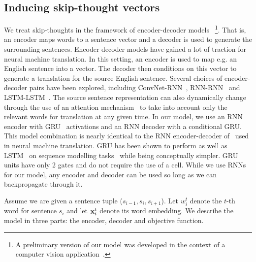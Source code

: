 \documentclass{article} \usepackage{nips15submit_e,times}
\begin{document}
\subsection{Inducing skip-thought vectors}

We treat skip-thoughts in the framework of encoder-decoder models ~\footnote{A preliminary version of
our model was developed in the context of a computer vision application~\cite{moviebook15}.}. That is, an encoder maps words to a sentence vector and a decoder is used to generate the surrounding sentences. Encoder-decoder models have gained a lot of traction for neural machine translation. In this setting, an encoder is used to map e.g. an English sentence into a vector. The decoder then conditions on this vector to generate a translation for the source English sentence. Several choices of encoder-decoder pairs have been explored, including ConvNet-RNN~\cite{kalchbrenner2013recurrent}, RNN-RNN~\cite{cho2014learning} and LSTM-LSTM~\cite{sutskever2014sequence}. The source sentence representation can also dynamically change through the use of an attention mechanism~\cite{bahdanau2014neural} to take into account only the relevant words for translation at any given time. In our model, we use an RNN encoder with GRU~\cite{chung2014empirical} activations and an RNN decoder with a conditional GRU. This model combination is nearly identical to the RNN encoder-decoder of~\cite{cho2014learning} used in neural machine translation. GRU has been shown to perform as well as LSTM~\cite{hochreiter1997long} on sequence modelling tasks~\cite{chung2014empirical} while being conceptually simpler. GRU units have only 2 gates and do not require the use of a cell. While we use RNNs for our model, any encoder and decoder can be used so long as we can backpropagate through it.

Assume we are given a sentence tuple ($s_{i-1}, s_i, s_{i+1}$). Let $w^t_i$ denote the $t$-th word for sentence $s_i$ and let ${\bf x}^t_i$ denote its word embedding. We describe the model in three parts: the encoder, decoder and objective function.
\end{document}
